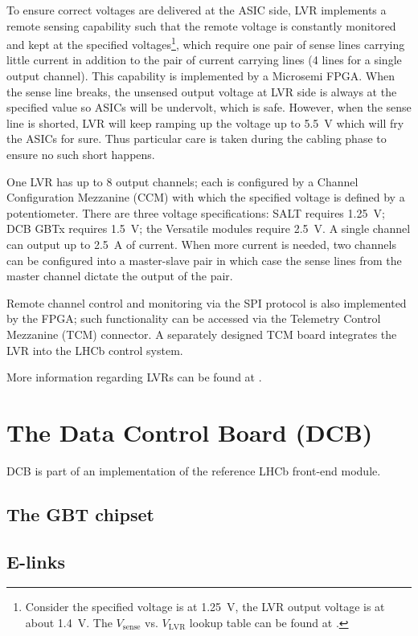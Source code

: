 To ensure correct voltages are delivered at the ASIC side,
LVR implements a remote sensing capability such that the remote voltage is
constantly monitored and kept at the specified voltages\footnote{
    Consider the specified voltage is at 1.25~V, the LVR output voltage is
    at about 1.4~V.
    The $V_\text{sense}$ vs. $V_\text{LVR}$ lookup table can be found at
    \cite{LVR_output_voltage_lookup}.
}, which require one
pair of sense lines carrying little current in addition to the pair of current
carrying lines (4 lines for a single output channel).
This capability is implemented by a Microsemi FPGA.
When the sense line breaks, the unsensed output voltage at LVR side is always
at the specified value so ASICs will be undervolt, which is safe.
However, when the sense line is shorted, LVR will keep ramping up the voltage
up to 5.5~V which will fry the ASICs for sure.
Thus particular care is taken during the cabling phase to ensure no such short
happens.

One LVR has up to 8 output channels; each is configured by a Channel
Configuration Mezzanine (CCM) with which the specified voltage is defined by a
potentiometer.
There are three voltage specifications: SALT requires 1.25~V; DCB GBTx requires
1.5~V; the Versatile modules require 2.5~V.
A single channel can output up to 2.5~A of current.
When more current is needed, two channels can be configured into a master-slave
pair in which case the sense lines from the master channel dictate the output
of the pair.

Remote channel control and monitoring via the SPI protocol is also implemented
by the FPGA;
such functionality can be accessed via the Telemetry Control Mezzanine (TCM)
connector.
A separately designed TCM board integrates the LVR into the LHCb control system.

More information regarding LVRs can be found at \cite{LVR_manual}.


\section{The Data Control Board (DCB)}
\label{ref:ut:dcb}

DCB is part of an implementation of the reference LHCb front-end module.


\subsection{The GBT chipset}


\subsection{E-links}


